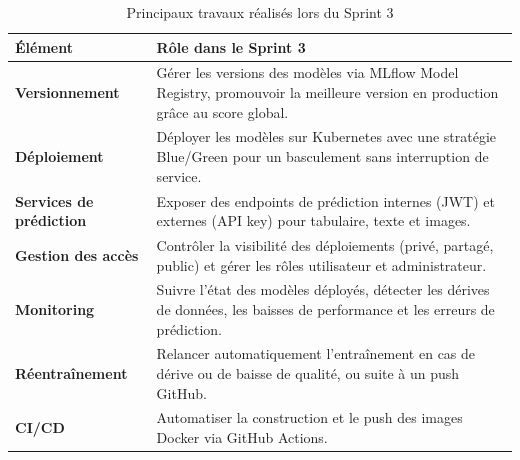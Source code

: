 \begin{table}[H]

\centering
\small

\renewcommand{\arraystretch}{1.16}
\setlength{\tabcolsep}{5pt}

\begin{tabular}{|p{4cm}|p{9.2cm}|}

\hline

\rowcolor{cyan!20}
\textbf{Élément}
&
\textbf{Rôle dans le Sprint 3}
\\
\hline

\textbf{Versionnement}
&
Gérer les versions des modèles via MLflow Model Registry, promouvoir
la meilleure version en production grâce au score global.
\\
\hline

\rowcolor{cyan!7}
\textbf{Déploiement}
&
Déployer les modèles sur Kubernetes avec une stratégie Blue/Green
pour un basculement sans interruption de service.
\\
\hline

\textbf{Services de prédiction}
&
Exposer des endpoints de prédiction internes (JWT) et externes
(API key) pour tabulaire, texte et images.
\\
\hline

\rowcolor{cyan!7}
\textbf{Gestion des accès}
&
Contrôler la visibilité des déploiements (privé, partagé, public)
et gérer les rôles utilisateur et administrateur.
\\
\hline

\textbf{Monitoring}
&
Suivre l'état des modèles déployés, détecter les dérives de données,
les baisses de performance et les erreurs de prédiction.
\\
\hline

\rowcolor{cyan!7}
\textbf{Réentraînement}
&
Relancer automatiquement l'entraînement en cas de dérive ou de
baisse de qualité, ou suite à un push GitHub.
\\
\hline

\textbf{CI/CD}
&
Automatiser la construction et le push des images Docker via
GitHub Actions.
\\
\hline

\end{tabular}

\caption{Principaux travaux réalisés lors du Sprint 3}
\label{tab:travaux-sprint3}

\end{table}



